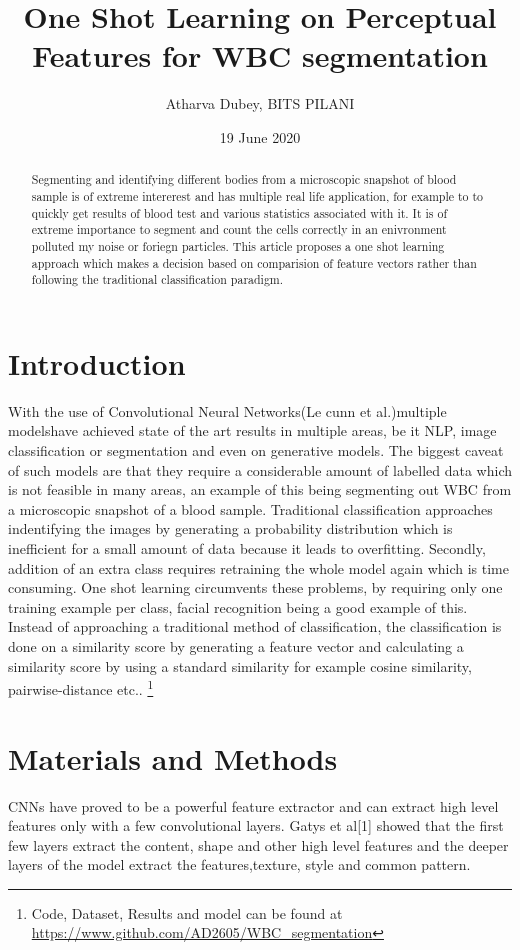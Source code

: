 \documentclass[]{article}
\title{One Shot Learning on Perceptual Features for WBC segmentation }
\author{Atharva Dubey, BITS PILANI}
\date{19 June 2020}
\begin{document}
\maketitle

\begin{abstract}
Segmenting and identifying different bodies from a microscopic snapshot of blood sample is of extreme intererest and has multiple real life application, for example to to quickly get results of blood test and various statistics associated with it. It is of extreme importance to segment and count the cells correctly in an enivronment polluted my noise or foriegn particles. This article proposes a one shot learning approach which makes a decision based on comparision of feature vectors rather than following the traditional classification paradigm. 
\end{abstract}

\section{Introduction}
With the use of Convolutional Neural Networks(Le cunn et al.)multiple models\protect have achieved state of the art results in multiple areas, be it NLP, image classification or segmentation and even on generative models. The biggest caveat of such models are that they require a considerable amount of labelled data which is not feasible in many areas, an example of this being segmenting out WBC from a microscopic snapshot of a blood sample. 
Traditional classification approaches indentifying the images by generating a probability distribution which is inefficient for a small amount of data because it leads to overfitting. Secondly, addition of an extra class requires retraining the whole model again which is time consuming. 
One shot learning circumvents these problems, by requiring only one training example per class, facial recognition being a good example of this. Instead of approaching a traditional method of classification, the classification is done on a similarity score by generating a feature vector and calculating a similarity score by using a standard similarity for example cosine similarity, pairwise-distance etc..
\footnote{Code, Dataset, Results and model can be found at \url{https://www.github.com/AD2605/WBC_segmentation}}


\section{Materials and Methods}
CNNs have proved to be a powerful feature extractor and can extract high level features only with a few convolutional layers. Gatys et al[1] showed that the first few layers extract the content, shape and other high level features and the deeper layers of the model extract the features,texture, style and common pattern.  
\end{document}
